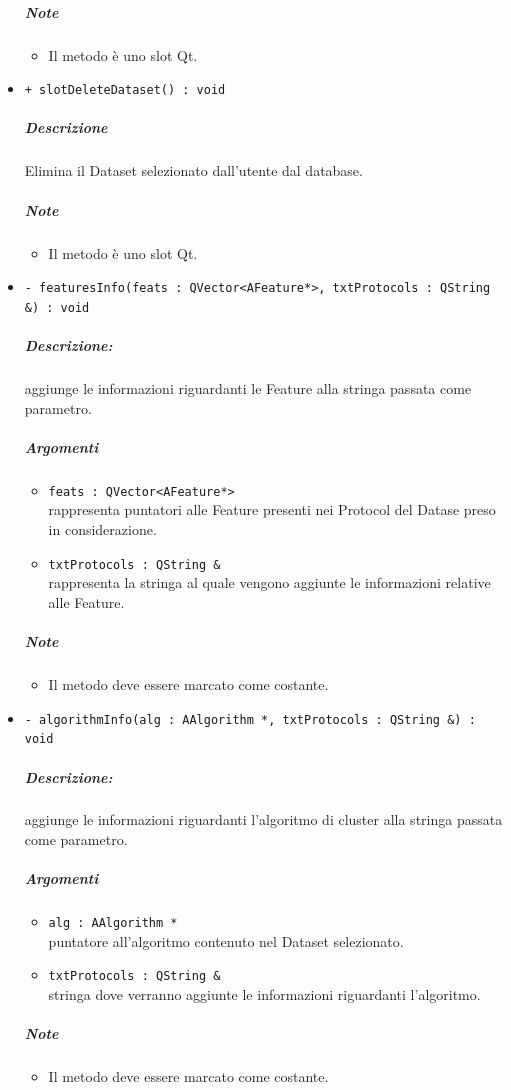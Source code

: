 \begin{itemize}
			\subparagraph{Note}
			\begin{itemize}
				\item Il metodo è uno slot\g{} Qt\g{}.
			\end{itemize}
			\item \color{blue} \verb!+ slotDeleteDataset() : void!
			\color{black}
			\subparagraph{Descrizione} Elimina il Dataset\g{} selezionato dall'utente dal database.
			\subparagraph{Note}
			\begin{itemize}
				\item Il metodo è uno slot\g{} Qt\g{}.
			\end{itemize}
			\item \color{blue} \verb!- featuresInfo(feats : QVector<AFeature*>, txtProtocols : QString &) : void!
			\color{black}
			\subparagraph{Descrizione:} aggiunge le informazioni riguardanti le Feature\g{} alla stringa passata come parametro.
			\color{black}
			\subparagraph{Argomenti}
			\begin{itemize}
				\item \color{RoyalPurple} \verb!feats : QVector<AFeature*>!\\				
\color{black} rappresenta puntatori alle Feature\g{} presenti nei Protocol\g{} del Datase\g{} preso in considerazione.
				\item \color{RoyalPurple} \verb!txtProtocols : QString &!\\				
\color{black} rappresenta la stringa al quale vengono aggiunte le informazioni relative alle Feature\g{}.
			\end{itemize}
			\subparagraph{Note}
			\begin{itemize}
				\item Il metodo deve essere marcato come costante.
			\end{itemize}
			\item \color{blue} \verb!- algorithmInfo(alg : AAlgorithm *, txtProtocols : QString &) : void!
			\color{black}
			\subparagraph{Descrizione:} aggiunge le informazioni riguardanti l'algoritmo di cluster\g{} alla stringa passata come parametro.
			\color{black}
			\subparagraph{Argomenti}
			\begin{itemize}
				\item \color{RoyalPurple} \verb!alg : AAlgorithm *!\\				
\color{black} puntatore all'algoritmo contenuto nel Dataset\g{} selezionato.
				\item \color{RoyalPurple} \verb!txtProtocols : QString &!\\				
\color{black} stringa dove verranno aggiunte le informazioni riguardanti l'algoritmo.
			\end{itemize}
			\subparagraph{Note}
			\begin{itemize}
				\item Il metodo deve essere marcato come costante.
			\end{itemize}
		\end{itemize}
